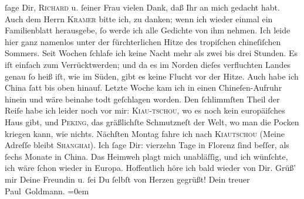\begin{ledgroupsized}[t]{13cm}
               ſage Dir, \textsc{Richard} u. ſeiner Frau vielen
               Dank, daß Ihr an mich gedacht habt. Auch dem Herrn \textsc{Kramer} bitte ich, zu danken; wenn ich wieder einmal ein Familienblatt herausgebe, ſo werde ich alle
               Gedichte von ihm nehmen.\pend
           \pstart
           Ich leide hier ganz namenlos unter der fürchterlichen Hitze des tropiſchen chineſiſchen Sommers. Seit
               Wochen ſchlafe {\pb}ich keine Nacht mehr als zwei bis
               drei Stunden. Es iſt einfach zum Verrücktwerden; und da es im Norden dieſes
               verfluchten Landes genau ſo
               heiß iſt, wie im Süden, gibt es keine Flucht vor der Hitze. Auch habe ich China ſatt bis oben hinauf. Letzte Woche kam ich
               in einen Chineſen-Aufruhr
               hinein und wäre beinahe todt geſchlagen worden. Den ſchlimmſten Theil der Reiſe habe
               ich leider noch vor mir: \textsc{Kiau-tschou}, wo es noch kein europäiſches Haus gibt, und \textsc{Peking}, das gräßlichſte Schmutzneſt der {\pb}Welt, wo man
               die Pocken kriegen kann, wie nichts. Nächſten Montag
               fahre ich nach \textsc{Kiautschou} (Meine Adreſſe bleibt \textsc{Shanghai}). Ich ſage Dir: vierzehn Tage in Florenz
               ſind beſſer, als ſechs Monate in China. Das
               Heimweh plagt mich unabläſſig, und ich wünſchte, ich wäre ſchon wieder in Europa.\pend
           \pstart
           Hoffentlich höre ich bald wieder von Dir. Grüß’ mir Deine Freundin u. ſei Du ſelbſt von Herzen
               gegrüßt!\pend
           \pstart
           Dein treuer {\\[\baselineskip]}\spacefill\mbox{Paul Goldmann.}\pend
           \leftskip=0em{}
         
         \endnumbering{}\end{ledgroupsized}  \newcommand{\dateiname}{L02853}\newcommand{\titel}{Paul Goldmann an Arthur Schnitzler, 21. 7. [1898]}\newcommand{\editorInnen}{Martin Anton Müller und Laura Untner}
      